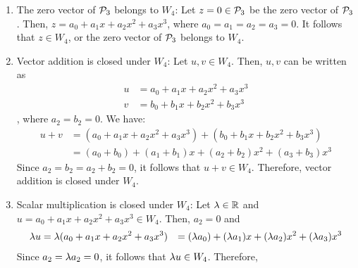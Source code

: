 \begin{sol}
\begin{enumerate}[(i)]
    \begin{enumerate}[(1)]
        \item The zero vector of $\P_3$ belongs to $W_4$: Let $z=0\in\P_3$ be the zero vector of $\P_3$. Then, $z=a_0+a_1x+a_2x^{2}+a_3x^{3}$, where $a_0=a_1=a_2=a_3=0$. It follows that $z\in W_4$, or the zero vector of $\P_3$ belongs to $W_4$.
        \item Vector addition is closed under $W_4$: Let $u,v\in W_4$. Then, $u, v$ can be written as
        \[
            \begin{aligned}
                u &= a_0+a_1x+a_2x^{2}+a_3x^{3}\\
                v &= b_0+b_1x+b_2x^{2}+b_3x^{3}
            \end{aligned}
        \]
        , where $a_2=b_2=0$. We have:
        \[
            \begin{aligned}
                u+v &= (a_0+a_1x+a_2x^{2}+a_3x^{3})+(b_0+b_1x+b_2x^{2}+b_3x^{3})\\
                    &= (a_0+b_0)+(a_1+b_1)x+(a_2+b_2)x^{2}+(a_3+b_3)x^{3}
            \end{aligned}
        \]
        Since $a_2=b_2=a_2+b_2=0$, it follows that $u+v\in W_4$. Therefore, vector addition is closed under $W_4$.
        \item Scalar multiplication is closed under $W_4$: Let $\lam\in\R$ and $u=a_0+a_1x+a_2x^{2}+a_3x^{3}\in W_4$. Then, $a_2=0$ and
        \[
            \begin{aligned}
                \lam u &= \lam(a_0+a_1x+a_2x^{2}+a_3x^{3})
                       &= (\lam a_0)+(\lam a_1)x+(\lam a_2)x^{2}+(\lam a_3)x^{3}
            \end{aligned}    
        \]
        Since $a_2=\lam a_2=0$, it follows that $\lam u\in W_4$. Therefore, 
    \end{enumerate}
\end{enumerate}
\end{sol}